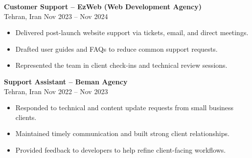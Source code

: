 \documentclass[letterpaper,11pt]{article}
\begin{document}
\textbf{Customer Support – EzWeb (Web Development Agency)}\\
Tehran, Iran \hfill Nov 2023 -- Nov 2024
\begin{itemize}[leftmargin=*]
  \item Delivered post-launch website support via tickets, email, and direct meetings.
  \item Drafted user guides and FAQs to reduce common support requests.
  \item Represented the team in client check-ins and technical review sessions.
\end{itemize}

\textbf{Support Assistant – Beman Agency}\\
Tehran, Iran \hfill Nov 2022 -- Nov 2023
\begin{itemize}[leftmargin=*]
  \item Responded to technical and content update requests from small business clients.
  \item Maintained timely communication and built strong client relationships.
  \item Provided feedback to developers to help refine client-facing workflows.
\end{itemize}
\end{document}
